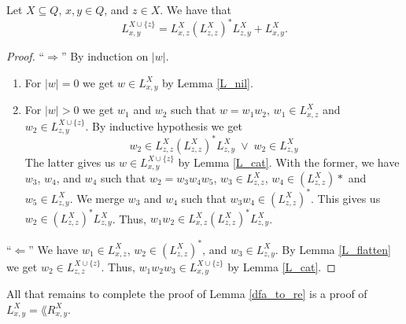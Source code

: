\begin{lemma}
    \label{L_rec}
    Let $X \subseteq Q$, $x,y \in Q$, and $z \in X$.
    We have that 
    \begin{equation*}
        L^{X\cup\{z\}}_{x,y} = L^X_{x,z} (L^X_{z,z})^* L^X_{z,y} + L^X_{x,y}.
    \end{equation*}
\end{lemma}
\begin{proof}
    ``$\Rightarrow$''
    By induction on $|w|$.
    \begin{enumerate}
        \item For $|w| = 0$ we get $w \in L^X_{x,y}$ by Lemma \ref{L_nil}. 
        \item For $|w| > 0$ we get $w_1$ and $w_2$ such that $w = w_1 w_2$, $w_1 \in L^X_{x,z}$ and $w_2 \in L^{X\cup\{z\}}_{z,y}$.
            By inductive hypothesis we get 
            \begin{equation*}
             w_2 \in
               L^X_{z,z} (L^X_{z,z})^* L^X_{z,y} \; \vee \; w_2 \in L^X_{z,y}
            \end{equation*}
            The latter gives us $w \in L^{X\cup\{z\}}_{x,y}$ by Lemma \ref{L_cat}.
            With the former, we have $w_3$, $w_4$, and $w_4$ such that $w_2 = w_3 w_4 w_5$, $w_3 \in L^{X}_{z,z}$,
            $w_4 \in (L^X_{z,z})*$ and $w_5 \in L^X_{z,y}$.
            We merge $w_3$ and $w_4$ such that $w_3 w_4 \in (L^{X}_{z,z})^*$.
            This gives us $w_2  \in (L^{X}_{z,z})^* L^X_{z,y}$.
            Thus, $w_1 w_2 \in L^X_{x,z} (L^X_{z,z})^* L^X_{z,y}$.
        \end{enumerate}

    ``$\Leftarrow$''
    We have $w_1 \in L^X_{x,z}$, $w_2 \in (L^X_{z,z})^*$, and $w_3 \in L^X_{z,y}$.
    By Lemma \ref{L_flatten} we get $w_2 \in L^{X\cup\{z\}}_{z,z}$.
    Thus, $w_1 w_2 w_3 \in L^{X\cup\{z\}}_{x,y}$ by Lemma \ref{L_cat}.
\end{proof}

All that remains to complete the proof of Lemma \ref{dfa_to_re} is a proof of $L^X_{x,y} = \lang{R^X_{x,y}}$.

